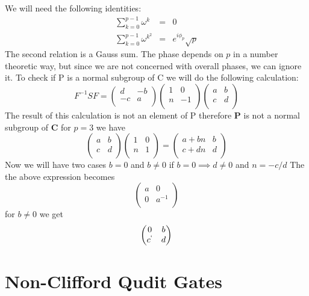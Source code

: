 \documentclass{article}
\begin{document}
We will need the following identities:
\begin{eqnarray}
\sum_{k=0}^{p-1} \omega^k & = & 0 \\
\sum_{k=0}^{p-1} \omega^{k^2} &= & e^{i \phi_p} \sqrt{p} 
\end{eqnarray}
The second relation is a Gauss sum. The phase depends on $p$ in a number theoretic way, but since we are not concerned with overall phases, we can ignore it. 
To check if P is a normal subgroup of C we will do the following calculation:
\[
F^{-1}SF=
\begin{pmatrix}
d & -b\\
-c & a\\
\end{pmatrix}
\begin{pmatrix}
1 & 0\\
n & -1\\
\end{pmatrix}
\begin{pmatrix}
a & b\\
c & d\\
\end{pmatrix}
\]
The result of this calculation is not an element of P therefore $\mathbf{P}$ is not a normal subgroup of $\mathbf{C}$
for $p=3$ we have
\[
\begin{pmatrix}
a & b\\
c & d\\
\end{pmatrix}
\begin{pmatrix}
1 & 0\\
n & 1\\
\end{pmatrix}
=
\begin{pmatrix}
a+bn & b\\
c+dn & d\\
\end{pmatrix}
\]
Now we will have two cases $b=0$ and $b\neq{0}$
if $b=0 \implies d\neq 0$ and $n=-c/d$
The the above expression becomes
\[
\begin{pmatrix}
a & 0\\
0 & a^{-1}\\
\end{pmatrix}
\]
for $b\neq 0$ we get
\[
\begin{pmatrix}
0 & b\\
c^{`} & d\\
\end{pmatrix}
\]


\section{Non-Clifford Qudit Gates}
\end{document}
